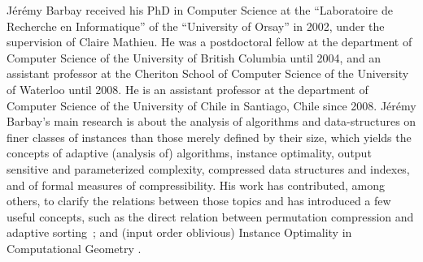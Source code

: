 \documentclass[a4paper,10pt]{article}
\begin{document}
J\'er\'emy Barbay received his PhD in Computer Science at the ``Laboratoire de Recherche en Informatique'' of the ``University of Orsay'' in 2002, under the supervision of Claire Mathieu.  He was a postdoctoral fellow at the department of Computer Science of the University of British Columbia until 2004, and an assistant professor at the Cheriton School of Computer Science of the University of Waterloo until 2008. He is an assistant professor at the department of Computer Science of the University of Chile in Santiago, Chile since 2008.
%
J\'er\'emy Barbay's main research is about the analysis of algorithms and data-structures on finer classes of instances than those merely defined by their size, which yields the concepts of adaptive (analysis of) algorithms, instance optimality, output sensitive and parameterized complexity, compressed data structures and indexes, and of formal measures of compressibility.  His work has contributed, among others, to clarify the relations between those topics and has introduced a few useful concepts, such as the direct relation between permutation compression and adaptive sorting~\cite{2013-TCS-CompressedRepresentationsOfPermutationsAndApplications-BarbayNavarro};
 and (input order oblivious) Instance Optimality in Computational Geometry \cite{2017-JACM-InstanceOptimalGeometricAlgorithms-AfshaniBarbayChan}. 
\end{document}
